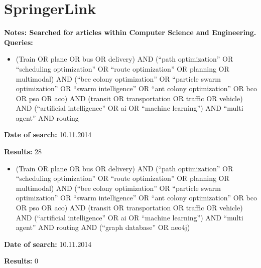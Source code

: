\section{SpringerLink}
\textbf{Notes: Searched for articles within Computer Science and Engineering.}
\newline
\newline
\textbf{Queries:}
\begin{itemize}
\item (Train OR plane OR bus OR delivery) AND (``path optimization'' OR ``scheduling optimization'' OR ``route optimization'' OR planning OR multimodal) AND (``bee colony optimization'' OR ``particle swarm optimization'' OR ``swarm intelligence'' OR ``ant colony optimization'' OR bco OR pso OR aco) AND (transit OR transportation OR traffic OR vehicle) AND (``artificial intelligence'' OR ai OR ``machine learning'') AND ``multi agent'' AND routing
\end{itemize}
\par \textbf{Date of search:} 10.11.2014
\par \textbf{Results:} 28
\begin{itemize}
\item (Train OR plane OR bus OR delivery) AND (``path optimization'' OR ``scheduling optimization'' OR ``route optimization'' OR planning OR multimodal) AND (``bee colony optimization'' OR ``particle swarm optimization'' OR ``swarm intelligence'' OR ``ant colony optimization'' OR bco OR pso OR aco) AND (transit OR transportation OR traffic OR vehicle) AND (``artificial intelligence'' OR ai OR ``machine learning'') AND ``multi agent'' AND routing AND (``graph database'' OR neo4j)
\end{itemize}
\par \textbf{Date of search:} 10.11.2014
\par \textbf{Results:} 0


